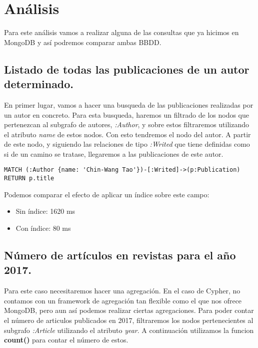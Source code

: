 \section{Análisis}

Para este análisis vamos a realizar alguna de las consultas que ya hicimos en MongoDB y así podremos comparar ambas \gls{BBDD}.

\subsection{Listado de todas las publicaciones de un autor determinado.}

En primer lugar, vamos a hacer una busqueda de las publicaciones realizadas por un autor en concreto. Para esta busqueda, haremos un filtrado de los nodos que pertenezcan al subgrafo de autores, \textit{:Author}, y sobre estos filtraremos utilizando el atributo \textit{name} de estos nodos. Con esto tendremos el nodo del autor. A partir de este nodo, y siguiendo las relaciones de tipo \textit{:Writed} que tiene definidas como si de un camino se tratase, llegaremos a las publicaciones de este autor.

\begin{verbatim}
MATCH (:Author {name: 'Chin-Wang Tao'})-[:Writed]->(p:Publication)
RETURN p.title
\end{verbatim}

Podemos comparar el efecto de aplicar un índice sobre este campo:

\begin{itemize}
 \item Sin índice: 1620 ms
 \item Con índice: 80 ms
\end{itemize}


\subsection{Número de artículos en revistas para el año 2017.}

Para este caso necesitaremos hacer una agregación. En el caso de Cypher, no contamos con un framework de agregación tan flexible como el que nos ofrece MongoDB, pero aun así podemos realizar ciertas agregaciones. Para poder contar el número de articulos publicados en 2017, filtraremos los nodos pertenecientes al subgrafo \textit{:Article} utilizando el atributo \textit{year}. A continuación utilizamos la funcion \textbf{count()} para contar el número de estos.

